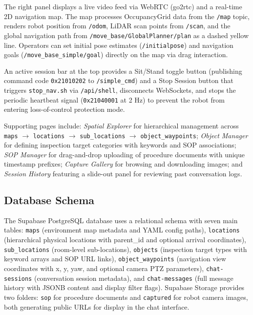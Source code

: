 \documentclass[conference]{IEEEtran}
\begin{document}
The right panel displays a live video feed via WebRTC (go2rtc) and a real-time 2D navigation map. The map processes OccupancyGrid data from the \texttt{/map} topic, renders robot position from \texttt{/odom}, LiDAR scan points from \texttt{/scan}, and the global navigation path from \texttt{/move\_base/GlobalPlanner/plan} as a dashed yellow line. Operators can set initial pose estimates (\texttt{/initialpose}) and navigation goals (\texttt{/move\_base\_simple/goal}) directly on the map via drag interaction.

An active session bar at the top provides a Sit/Stand toggle button (publishing command code \texttt{0x21010202} to \texttt{/simple\_cmd}) and a Stop Session button that triggers \texttt{stop\_nav.sh} via \texttt{/api/shell}, disconnects WebSockets, and stops the periodic heartbeat signal (\texttt{0x21040001} at 2 Hz) to prevent the robot from entering loss-of-control protection mode.

Supporting pages include: \textit{Spatial Explorer} for hierarchical management across \texttt{maps} $\rightarrow$ \texttt{locations} $\rightarrow$ \texttt{sub\_locations} $\rightarrow$ \texttt{object\_waypoints}; \textit{Object Manager} for defining inspection target categories with keywords and SOP associations; \textit{SOP Manager} for drag-and-drop uploading of procedure documents with unique timestamp prefixes; \textit{Capture Gallery} for browsing and downloading images; and \textit{Session History} featuring a slide-out panel for reviewing past conversation logs.

\subsection{Database Schema}
The Supabase PostgreSQL database uses a relational schema with seven main tables: \texttt{maps} (environment map metadata and YAML config paths), \texttt{locations} (hierarchical physical locations with parent\_id and optional arrival coordinates), \texttt{sub\_locations} (room-level sub-locations), \texttt{objects} (inspection target types with keyword arrays and SOP URL links), \texttt{object\_waypoints} (navigation view coordinates with x, y, yaw, and optional camera PTZ parameters), \texttt{chat-sessions} (conversation session metadata), and \texttt{chat-messages} (full message history with JSONB content and display filter flags). Supabase Storage provides two folders: \texttt{sop} for procedure documents and \texttt{captured} for robot camera images, both generating public URLs for display in the chat interface.
\end{document}
